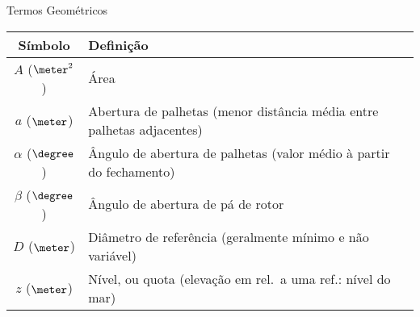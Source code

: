     \begin{frame}{Termos Geométricos}\vspace*{-1em}

        \setlength{\tabcolsep}{2mm}
        \noindent\begin{longtable}{cp{110mm}}
            \alert{Símbolo} & \alert{Definição} \\
            \hline
            $A$ ($\meter^2$) &
            Área \\
            $a$ ($\meter$) &
            Abertura de palhetas (menor distância média entre palhetas adjacentes) \\
            $\alpha$ ($\degree$) &
            Ângulo de abertura de palhetas (valor médio à partir do fechamento) \\
            $\beta$ ($\degree$) &
            Ângulo de abertura de pá de rotor \\
            $D$ ($\meter$) &
            Diâmetro de referência (geralmente mínimo e não variável) \\
            $z$ ($\meter$) &
            Nível, ou quota (elevação em rel.~a uma ref.: nível do mar) \\
            \hline
        \end{longtable}

    \end{frame}

    \begin{frame}\vspace*{-1em}
    \end{frame}

